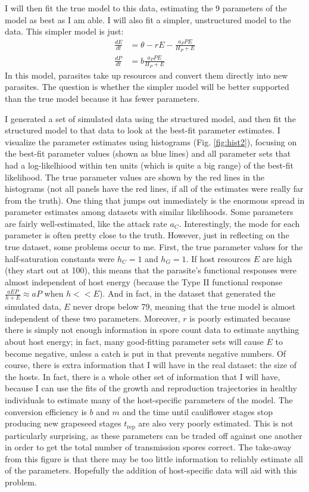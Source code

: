\documentclass[12pt,reqno,final,pdftex]{amsart}\usepackage[]{graphicx}\usepackage[]{color}
\theoremstyle{plain}
\numberwithin{equation}{part}
\begin{document}
I will then fit the true model to this data, estimating the 9 parameters of the model as best as I am able.
I will also fit a simpler, unstructured model to the data.
This simpler model is just:
\begin{align*}
\frac{dE}{dt} &= \theta - rE - \frac{a_P P E}{H_P + E} \\
\frac{dP}{dt} &= b \frac{a_P P E}{H_P + E}
\end{align*}
In this model, parasites take up resources and convert them directly into new parasites.
The question is whether the simpler model will be better supported than the true model because it has fewer parameters.

I generated a set of simulated data using the structured model, and then fit the structured model to that data to look at the best-fit parameter estimates.
I visualize the parameter estimates using histograms (Fig. \ref{fig:hist2}), focusing on the best-fit parameter values (shown as blue lines) and all parameter sets that had a log-likelhiood within ten units (which is quite a big range) of the best-fit likelihood.
The true parameter values are shown by the red lines in the histograms (not all panels have the red lines, if all of the estimates were really far from the truth).
One thing that jumps out immediately is the enormous spread in parameter estimates among datasets with similar likelihoods.
Some parameters are fairly well-estimated, like the attack rate $a_C$.
Interestingly, the mode for each parameter is often pretty close to the truth.
However, just in reflecting on the true dataset, some problems occur to me.
First, the true parameter values for the half-saturation constants were $h_C=1$ and $h_G=1$.
If host resources $E$ are high (they start out at 100), this means that the parasite's functional responses were almost independent of host energy (because the Type II functional response $\frac{aEP}{h+E} \approx aP$ when $h << E$).
And in fact, in the dataset that generated the simulated data, $E$ never drops below 79, meaning that the true model is almost independent of these two parameters.
Moreover, $r$ is poorly estimated because there is simply not enough information in spore count data to estimate anything about host energy; in fact, many good-fitting parameter sets will cause $E$ to become negative, unless a catch is put in that prevents negative numbers.
Of course, there is extra information that I will have in the real dataset: the size of the hosts.
In fact, there is a whole other set of information that I will have, because I can use the fits of the growth and reproduction trajectories in healthy individuals to estimate many of the host-specific parameters of the model.
The conversion efficiency is  $b$ and $m$ and the time until cauliflower stages stop producing new grapeseed stages $t_{\text{rep}}$ are also very poorly estimated.
This is not particularly surprising, as these parameters can be traded off against one another in order to get the total number of transmission spores correct.
The take-away from this figure is that there may be too little information to reliably estimate all of the parameters.
Hopefully the addition of host-specific data will aid with this problem.
\end{document}
